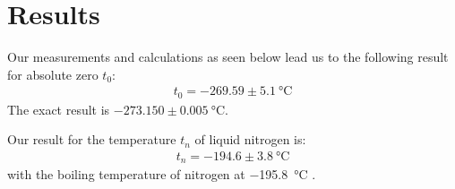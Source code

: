 \section{Results}

Our measurements and calculations as seen below lead us to the following result for absolute zero $t_0$:
\begin{align}
	t_0 = -269.59 \pm \SI{5.1}{\degreeCelsius} 
\end{align}
The exact result is $-273.150 \pm \SI{0.005}{\degreeCelsius}$. 


Our result for the temperature $t_n$ of liquid nitrogen is:
\begin{align}
	t_n = -194.6 \pm \SI{3.8}{\degreeCelsius} 
\end{align}
with the boiling temperature of nitrogen \cite{nitro} at \SI{-195.8}{\degreeCelsius}  .
